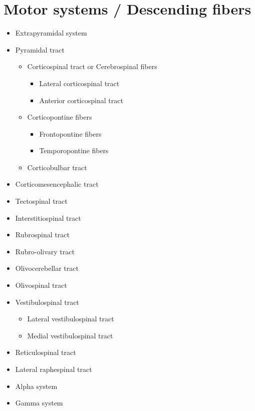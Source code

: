\hypertarget{motor-systems-descending-fibers}{%
\section{Motor systems / Descending fibers}\label{motor-systems-descending-fibers}}

\begin{itemize}
\tightlist
\item
  Extrapyramidal system
\item
  Pyramidal tract

  \begin{itemize}
  \tightlist
  \item
    Corticospinal tract or Cerebrospinal fibers

    \begin{itemize}
    \tightlist
    \item
      Lateral corticospinal tract
    \item
      Anterior corticospinal tract
    \end{itemize}
  \item
    Corticopontine fibers

    \begin{itemize}
    \tightlist
    \item
      Frontopontine fibers
    \item
      Temporopontine fibers
    \end{itemize}
  \item
    Corticobulbar tract
  \end{itemize}
\item
  Corticomesencephalic tract
\item
  Tectospinal tract
\item
  Interstitiospinal tract
\item
  Rubrospinal tract
\item
  Rubro-olivary tract
\item
  Olivocerebellar tract
\item
  Olivospinal tract
\item
  Vestibulospinal tract

  \begin{itemize}
  \tightlist
  \item
    Lateral vestibulospinal tract
  \item
    Medial vestibulospinal tract
  \end{itemize}
\item
  Reticulospinal tract
\item
  Lateral raphespinal tract
\item
  Alpha system
\item
  Gamma system
\end{itemize}

